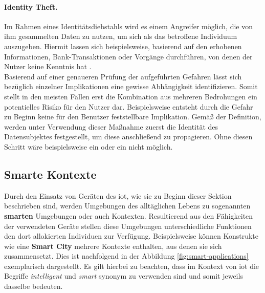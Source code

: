 \paragraph{Identity Theft.}
\label{sec:Grundlagen:para:Identity Theft}
Im Rahmen eines Identitätsdiebstahls wird es einem Angreifer möglich, die von ihm gesammelten Daten zu nutzen, um sich als das betroffene Individuum auszugeben. Hiermit lassen sich beispielsweise, basierend auf den erhobenen Informationen, Bank-Transaktionen oder Vorgänge durchführen, von denen der Nutzer keine Kenntnis hat \cite{SecPrivSmartCity2021}.\\

\noindent Basierend auf einer genaueren Prüfung der aufgeführten Gefahren lässt sich bezüglich einzelner Implikationen eine gewisse Abhängigkeit identifizieren. 
Somit stellt in den meisten Fällen erst die Kombination aus mehreren Bedrohungen ein potentielles Risiko für den Nutzer dar. Beispielsweise entsteht durch die Gefahr  zu Beginn keine für den Benutzer feststellbare Implikation. 
Gemäß der Definition, werden unter Verwendung dieser Maßnahme zuerst die Identität des Datensubjektes festgestellt, um diese anschließend zu propagieren. 
Ohne diesen Schritt wäre beispielsweise ein  oder ein  nicht möglich. 

\subsection{Smarte Kontexte}
\label{sec:Grundlagen:ssec:Smarte Kontexte}

Durch den Einsatz von Geräten des \ac{iot}, wie sie zu Beginn dieser Sektion beschrieben sind, werden Umgebungen des alltäglichen Lebens zu sogenannten \textbf{smarten} Umgebungen oder auch Kontexten. Resultierend aus den Fähigkeiten der verwendeten Geräte stellen diese Umgebungen unterschiedliche Funktionen den dort allokierten Individuen zur Verfügung. Beispielsweise können Konstrukte wie eine \textbf{Smart City} mehrere Kontexte enthalten, aus denen sie sich zusammensetzt. Dies ist nachfolgend in der Abbildung \ref{fig:smart-applications} exemplarisch dargestellt. Es gilt hierbei zu beachten, dass im Kontext von \ac{iot} die Begriffe \textit{intelligent} und \textit{smart} synonym zu verwenden sind und somit jeweils dasselbe bedeuten.

